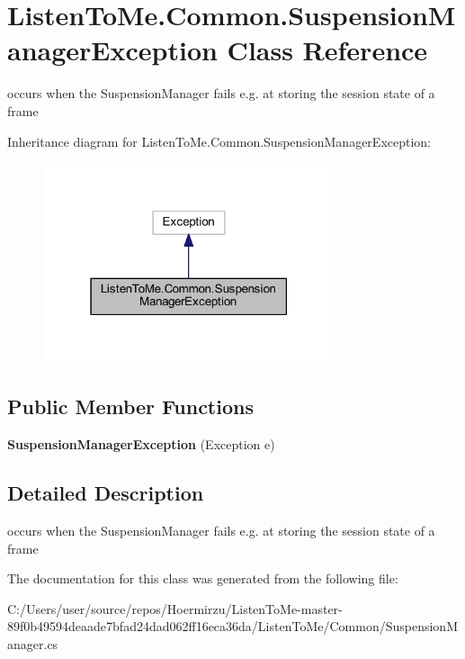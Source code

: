 \hypertarget{class_listen_to_me_1_1_common_1_1_suspension_manager_exception}{}\section{Listen\+To\+Me.\+Common.\+Suspension\+Manager\+Exception Class Reference}
\label{class_listen_to_me_1_1_common_1_1_suspension_manager_exception}


occurs when the Suspension\+Manager fails e.\+g. at storing the session state of a frame  




Inheritance diagram for Listen\+To\+Me.\+Common.\+Suspension\+Manager\+Exception\+:\nopagebreak
\begin{figure}[H]
\begin{center}
\leavevmode
\includegraphics[width=243pt]{class_listen_to_me_1_1_common_1_1_suspension_manager_exception__inherit__graph}
\end{center}
\end{figure}
\subsection*{Public Member Functions}
\begin{DoxyCompactItemize}
\item 
{\bfseries Suspension\+Manager\+Exception} (Exception e)\hypertarget{class_listen_to_me_1_1_common_1_1_suspension_manager_exception_a322fd8e293b8eb9342a29aae5eecb676}{}\label{class_listen_to_me_1_1_common_1_1_suspension_manager_exception_a322fd8e293b8eb9342a29aae5eecb676}

\end{DoxyCompactItemize}


\subsection{Detailed Description}
occurs when the Suspension\+Manager fails e.\+g. at storing the session state of a frame 



The documentation for this class was generated from the following file\+:\begin{DoxyCompactItemize}
\item 
C\+:/\+Users/user/source/repos/\+Hoermirzu/\+Listen\+To\+Me-\/master-\/89f0b49594deaade7bfad24dad062ff16eca36da/\+Listen\+To\+Me/\+Common/Suspension\+Manager.\+cs\end{DoxyCompactItemize}

